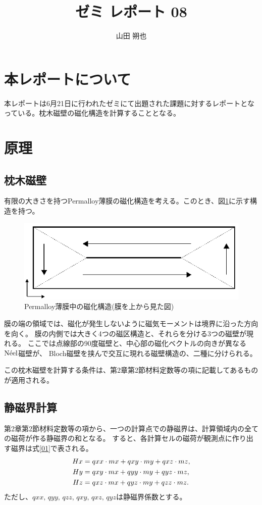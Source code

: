 \documentclass{jsarticle}
\begin{document}
\title{ゼミ レポート 08}
\author{山田 朔也}
\maketitle

\section{本レポートについて}
本レポートは6月21日に行われたゼミにて出題された課題に対するレポートとなっている。枕木磁壁の磁化構造を計算することとなる。

\section{原理}
\subsection{枕木磁壁}
有限の大きさを持つPermalloy薄膜の磁化構造を考える。このとき、図\ref{fig01}に示す構造を持つ。
\begin{figure}[H]
	\centering
	\includegraphics[width=14cm]{pic01.eps}
	\caption{Permalloy薄膜中の磁化構造(膜を上から見た図)}
	\label{fig01}
\end{figure}
膜の端の領域では、磁化が発生しないように磁気モーメントは境界に沿った方向を向く。
膜の内側では大きく4つの磁区構造と、それらを分ける3つの磁壁が現れる。
ここでは点線部の90度磁壁と、中心部の磁化ベクトルの向きが異なる$\mathrm{N\Acute{e}el}$磁壁が、
Bloch磁壁を挟んで交互に現れる磁壁構造の、二種に分けられる。

この枕木磁壁を計算する条件は、第2章第2節材料定数等の項に記載してあるものが適用される。

\subsection{静磁界計算}
第2章第2節材料定数等の項から、一つの計算点での静磁界は、計算領域内の全ての磁荷が作る静磁界の和となる。
すると、各計算セルの磁荷が観測点に作り出す磁界は式\ref{01}で表される。
\begin{align}
	Hx &= qxx\cdot mx + qxy\cdot my + qxz\cdot mz,	\notag \\
	Hy &= qxy\cdot mx + qyy\cdot my + qyz\cdot mz,	\label{01} \\
	Hz &= qxz\cdot mx + qyz\cdot my + qzz\cdot mz.	\notag 
\end{align}
ただし、$qxx,\,qyy,\,qzz,\,qxy,\,qxz,\,qyz$は静磁界係数とする。
\end{document}
